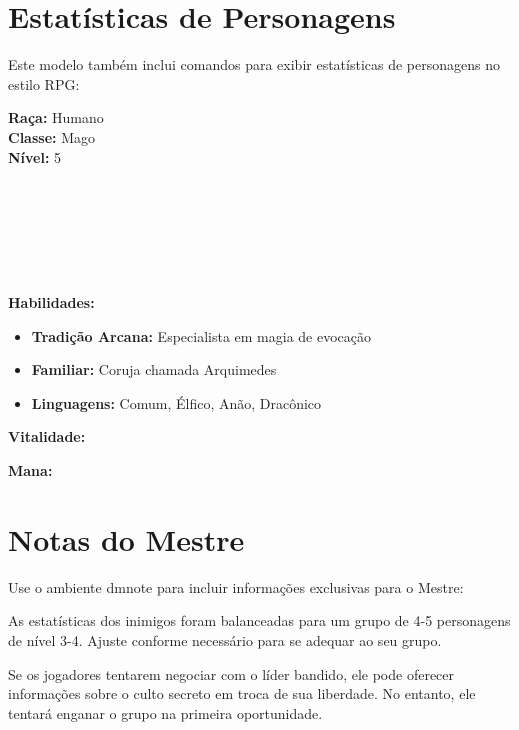 \section{Estatísticas de Personagens}

Este modelo também inclui comandos para exibir estatísticas de personagens no estilo RPG:

\begin{character}

\begin{multicols}{2}
\textbf{Raça:} Humano\\
\textbf{Classe:} Mago\\
\textbf{Nível:} 5

\columnbreak

\\
\\
\\
\\
\\
\end{multicols}

\textbf{Habilidades:}
\begin{itemize}
    \item \textbf{Tradição Arcana:} Especialista em magia de evocação
    \item \textbf{Familiar:} Coruja chamada Arquimedes
    \item \textbf{Linguagens:} Comum, Élfico, Anão, Dracônico
\end{itemize}

\textbf{Vitalidade:}\\

\textbf{Mana:}\\
\end{character}

\section{Notas do Mestre}

Use o ambiente dmnote para incluir informações exclusivas para o Mestre:

\begin{dmnote}
As estatísticas dos inimigos foram balanceadas para um grupo de 4-5 personagens de nível 3-4. Ajuste conforme necessário para se adequar ao seu grupo.

Se os jogadores tentarem negociar com o líder bandido, ele pode oferecer informações sobre o culto secreto em troca de sua liberdade. No entanto, ele tentará enganar o grupo na primeira oportunidade.
\end{dmnote}

